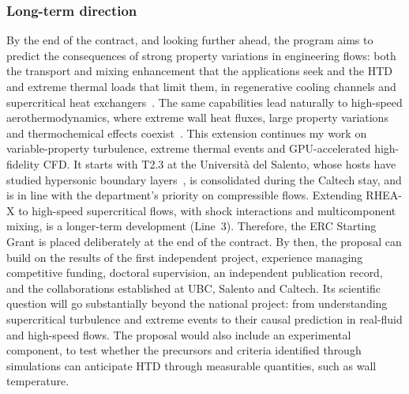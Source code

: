 \documentclass[11pt]{article}
\begin{document}
\subsubsection{Long-term direction}

By the end of the contract, and looking further ahead, the program aims to predict the consequences of strong property variations in engineering flows: both the transport and mixing enhancement that the applications seek and the HTD and extreme thermal loads that limit them, in regenerative cooling channels and supercritical heat exchangers~\cite{Pizzarelli2018,Ahn2015}. 
The same capabilities lead naturally to high-speed aerothermodynamics, where extreme wall heat fluxes, large property variations and thermochemical effects coexist~\cite{Urzay2018,DiRenzoUrzay2021,Passiatore2022}. 
This extension continues my work on variable-property turbulence, extreme thermal events and GPU-accelerated high-fidelity CFD. 
It starts with T2.3 at the Universit\`a del Salento, whose hosts have studied hypersonic boundary layers~\cite{DiRenzoUrzay2021,Passiatore2022}, is consolidated during the Caltech stay, and is in line with the department's priority on compressible flows. 
Extending RHEA-X to high-speed supercritical flows, with shock interactions and multicomponent mixing, is a longer-term development (Line~3).
Therefore, the ERC Starting Grant is placed deliberately at the end of the contract. 
By then, the proposal can build on the results of the first independent project, experience managing competitive funding, doctoral supervision, an independent publication record, and the collaborations established at UBC, Salento and Caltech. 
Its scientific question will go substantially beyond the national project: from understanding supercritical turbulence and extreme events to their causal prediction in real-fluid and high-speed flows.
The proposal would also include an experimental component, to test whether the precursors and criteria identified through simulations can anticipate HTD through measurable quantities, such as wall temperature.
\end{document}
